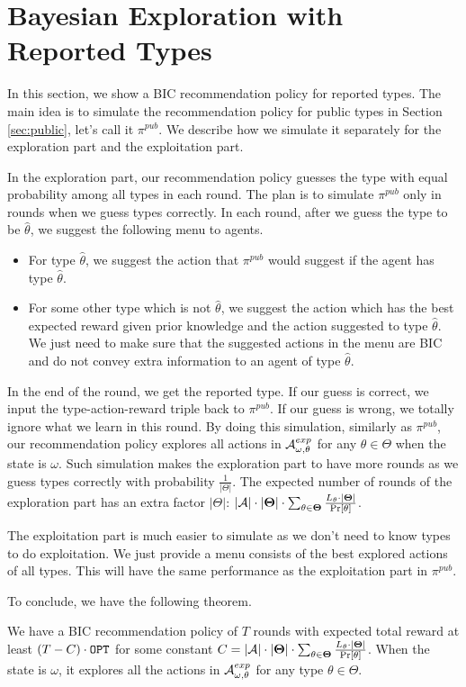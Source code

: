 
\section{Bayesian Exploration with Reported Types}
\label{sec:private_c}
In this section, we show a BIC recommendation policy for reported types. The main idea is to simulate the recommendation policy for public types in Section \ref{sec:public}, let's call it $\pi^{pub}$. We describe how we simulate it separately for the exploration part and the exploitation part.

In the exploration part, our recommendation policy guesses the type with equal probability among all types in each round. The plan is to simulate $\pi^{pub}$ only in rounds when we guess types correctly. In each round, after we guess the type to be $\hat{\theta}$, we suggest the following menu to agents.
\begin{itemize}
\item For type $\hat{\theta}$, we suggest the action that $\pi^{pub}$ would suggest if the agent has type $\hat{\theta}$.
\item For some other type which is not $\hat{\theta}$, we suggest the action which has the best expected reward given prior knowledge and the action suggested to type $\hat{\theta}$.  We just need to make sure that the suggested actions in the menu are BIC and do not convey extra information to an agent of type $\hat{\theta}$.
\end{itemize}
In the end of the round, we get the reported type. If our guess is correct, we input the type-action-reward triple back to $\pi^{pub}$. If our guess is wrong, we totally ignore what we learn in this round. By doing this simulation, similarly as $\pi^{pub}$, our recommendation policy explores all actions in $\mathcal{A}^{exp}_{\omega,\theta}$ for any $\theta \in \varTheta$ when the state is $\omega$. Such simulation makes the exploration part to have more rounds as we guess types correctly with probability $\frac{1}{|\varTheta|}$. The expected number of rounds of the exploration part has an extra factor $|\varTheta|$: $|\mathcal{A}| \cdot |\bold{\Theta}| \cdot \sum_{\theta\in\bold{\Theta}} \frac{L_{\theta}\cdot |\bold{\Theta}|}{\Pr[\theta]}$.

The exploitation part is much easier to simulate as we don't need to know types to do exploitation. We just provide a menu consists of the best explored actions of all types. This will have the same performance as the exploitation part in $\pi^{pub}$.

To conclude, we have the following theorem.

\begin{theorem}
\label{thm:reported}
We have a BIC recommendation policy of $T$ rounds with expected total reward at least $\left(T - C \right) \cdot \mathtt{OPT}$ for some constant $C = |\mathcal{A}| \cdot |\bold{\Theta}| \cdot \sum_{\theta\in\bold{\Theta}} \frac{L_{\theta}\cdot |\bold{\Theta}|}{\Pr[\theta]}$. When the state is $\omega$, it explores all the actions in $\mathcal{A}^{exp}_{\omega,\theta}$ for any type $\theta \in \varTheta$.
\end{theorem}
